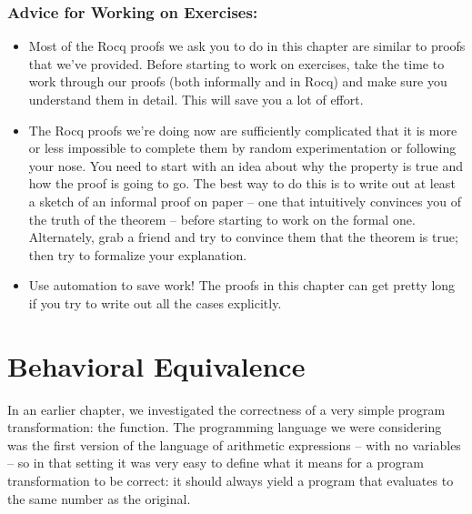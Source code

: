 \documentclass[12pt]{report}
\begin{document}
\subsubsection{Advice for Working on Exercises:}





\begin{itemize}
\item  Most of the Rocq proofs we ask you to do in this chapter are
      similar to proofs that we've provided.  Before starting to work
      on exercises, take the time to work through our proofs (both
      informally and in Rocq) and make sure you understand them in
      detail.  This will save you a lot of effort.



\item  The Rocq proofs we're doing now are sufficiently complicated that
      it is more or less impossible to complete them by random
      experimentation or following your nose.  You need to start with
      an idea about why the property is true and how the proof is
      going to go.  The best way to do this is to write out at least a
      sketch of an informal proof on paper -- one that intuitively
      convinces you of the truth of the theorem -- before starting to
      work on the formal one.  Alternately, grab a friend and try to
      convince them that the theorem is true; then try to formalize
      your explanation.



\item  Use automation to save work!  The proofs in this chapter can get
      pretty long if you try to write out all the cases explicitly. 

\end{itemize}
\begin{coqdoccode}
\coqdocemptyline
\end{coqdoccode}
\section{Behavioral Equivalence}



 In an earlier chapter, we investigated the correctness of a very
    simple program transformation: the  function.  The
    programming language we were considering was the first version of
    the language of arithmetic expressions -- with no variables -- so
    in that setting it was very easy to define what it means for a
    program transformation to be correct: it should always yield a
    program that evaluates to the same number as the original.
\end{document}

